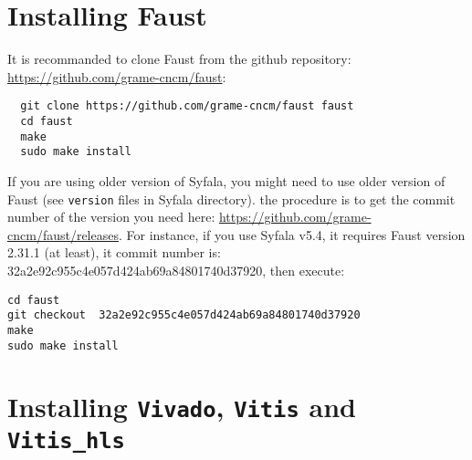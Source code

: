 
\section{Installing Faust}
\label{faust-install}
It is recommanded to clone Faust from the github repository: \url{https://github.com/grame-cncm/faust}:
\begin{verbatim}
  git clone https://github.com/grame-cncm/faust faust
  cd faust
  make
  sudo make install
\end{verbatim}
If you are using older version of Syfala, you might need to use older version of Faust (see {\tt version} files in Syfala directory). the procedure is to get the commit number of the version you need here: \url{https://github.com/grame-cncm/faust/releases}. For instance, if you use Syfala v5.4, it requires Faust version 2.31.1 (at least), it commit number is:  32a2e92c955c4e057d424ab69a84801740d37920, then execute:
\begin{verbatim}
cd faust 
git checkout  32a2e92c955c4e057d424ab69a84801740d37920
make 
sudo make install
\end{verbatim}

\section{Installing {\tt Vivado}, {\tt Vitis} and {\tt Vitis\_hls} }
\label{vitis-install}


